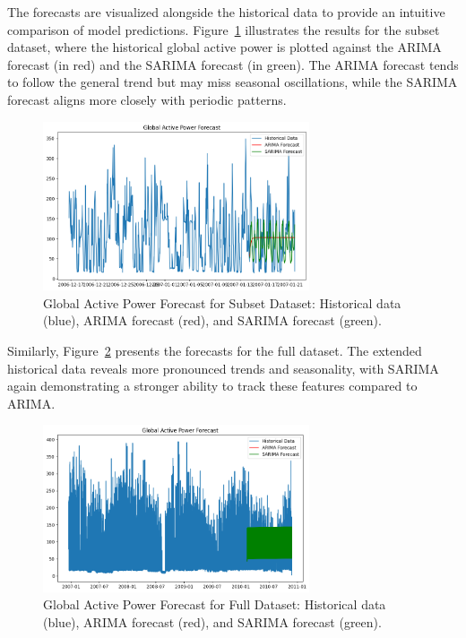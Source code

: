 	The forecasts are visualized alongside the historical data to provide an intuitive comparison of model predictions. Figure~\ref{fig:subset_forecast} illustrates the results for the subset dataset, where the historical global active power is plotted against the ARIMA forecast (in red) and the SARIMA forecast (in green). The ARIMA forecast tends to follow the general trend but may miss seasonal oscillations, while the SARIMA forecast aligns more closely with periodic patterns.
	
	\begin{figure}[h!]
		\centering
		\includegraphics[width=0.7\textwidth]{./figures_aman/path_to_subset_forecast_plot.png}
		\caption{Global Active Power Forecast for Subset Dataset: Historical data (blue), ARIMA forecast (red), and SARIMA forecast (green).}
		\label{fig:subset_forecast}
	\end{figure}
	
	Similarly, Figure~\ref{fig:full_forecast} presents the forecasts for the full dataset. The extended historical data reveals more pronounced trends and seasonality, with SARIMA again demonstrating a stronger ability to track these features compared to ARIMA.
	
	\begin{figure}[h!]
		\centering
		\includegraphics[width=0.7\textwidth]{./figures_aman/path_to_full_forecast_plot.png}
		\caption{Global Active Power Forecast for Full Dataset: Historical data (blue), ARIMA forecast (red), and SARIMA forecast (green).}
		\label{fig:full_forecast}
	\end{figure}
	
